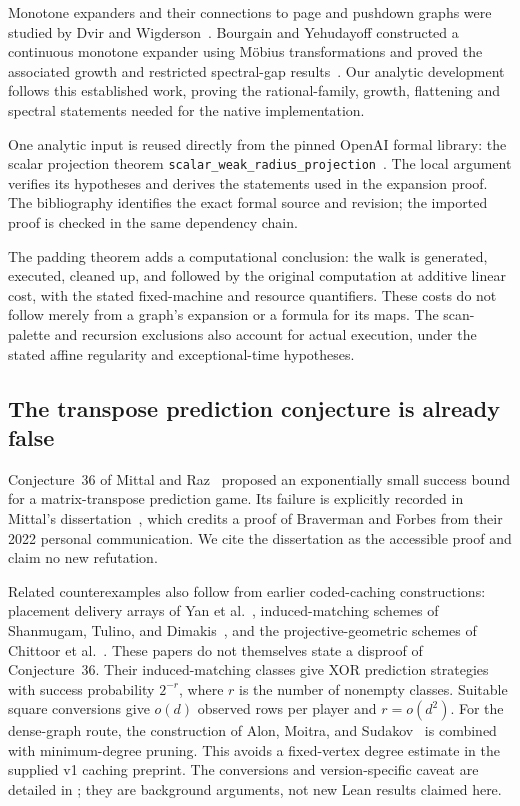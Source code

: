 Monotone expanders and their connections to page and pushdown graphs were
studied by Dvir and Wigderson~\cite{DvirWigderson2010}.
Bourgain and Yehudayoff constructed a continuous monotone expander using
M\"obius transformations and proved the associated growth and restricted
spectral-gap results~\cite{BourgainYehudayoff2013}. Our analytic development follows this established work, proving the
rational-family, growth, flattening and spectral statements needed for the
native implementation.

One analytic input is reused directly from the pinned OpenAI formal library:
the scalar projection theorem
\texttt{scalar\_weak\_radius\_projection}~\cite{OAIProjection2026}.
The local argument verifies its hypotheses and derives the statements used
in the expansion proof. The bibliography identifies the exact formal source
and revision; the imported proof is checked in the same dependency chain.

The padding theorem adds a computational conclusion: the walk is generated,
executed, cleaned up, and followed by the original computation at additive
linear cost, with the stated fixed-machine and resource quantifiers.
These costs do not follow merely from a graph's expansion or a formula for
its maps. The scan-palette and recursion exclusions also account for actual
execution, under the stated affine regularity and exceptional-time hypotheses.

\subsection{The transpose prediction conjecture is already false}

Conjecture~36 of Mittal and Raz~\cite{MittalRaz2021} proposed an exponentially
small success bound for a matrix-transpose prediction game. Its failure is
explicitly recorded in Mittal's dissertation~\cite[\S10.8.2, Proposition~10.8.3
and Lemma~10.8.5]{Mittal2025}, which credits a proof of Braverman and Forbes
from their 2022 personal communication. We cite the dissertation as the
accessible proof and claim no new refutation.

Related counterexamples also follow from earlier coded-caching constructions:
placement delivery arrays of Yan et al.~\cite{YanEtAl2017}, induced-matching
schemes of Shanmugam, Tulino, and Dimakis~\cite{ShanmugamEtAl2017}, and the
projective-geometric schemes of Chittoor et al.~\cite{ChittoorEtAl2021}.
These papers do not themselves state a disproof of Conjecture~36.
Their induced-matching classes give XOR prediction strategies with success
probability $2^{-r}$, where $r$ is the number of nonempty classes. Suitable
square conversions give $o(d)$ observed rows per player and $r=o(d^2)$.
For the dense-graph route, the construction of Alon, Moitra, and
Sudakov~\cite{AMS2013} is combined with minimum-degree pruning. This avoids a
fixed-vertex degree estimate in the supplied v1 caching preprint. The
conversions and version-specific caveat are detailed in
; they are background arguments, not new Lean
results claimed here.

